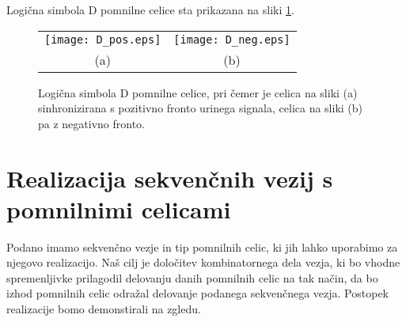 Logična simbola D pomnilne celice sta prikazana na sliki \ref{fig:D_shema}. 

\begin{figure}[!ht]
\begin{center}
\begin{tabular}{cc}
\texttt{[image: D\_pos.eps]} &
\texttt{[image: D\_neg.eps]} \bigskip \\
(a) & (b)
\end{tabular}
\caption{Logična simbola D pomnilne celice, pri čemer je celica na sliki (a) sinhronizirana s pozitivno fronto urinega signala, celica na sliki (b) pa z negativno fronto.}
\label{fig:D_shema}
\end{center}
\end{figure}


\section{Realizacija sekvenčnih vezij s pomnilnimi celicami}

Podano imamo sekvenčno vezje in tip pomnilnih celic, ki jih lahko uporabimo za njegovo realizacijo. Naš cilj je določitev kombinatornega dela vezja, ki bo vhodne spremenljivke prilagodil delovanju danih pomnilnih celic na tak način, da bo izhod pomnilnih celic odražal delovanje podanega sekvenčnega vezja. Postopek realizacije bomo demonstirali na zgledu.

